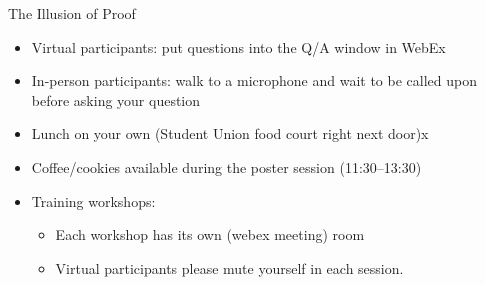 \documentclass[aspectratio=169, 12pt]{beamer}
\begin{document}
\begin{frame}{The Illusion of Proof}
  \begin{itemize}
  \item Virtual participants: put questions into the Q/A window in WebEx
  \item In-person participants: walk to a microphone and wait to be called upon
    before asking your question
  \item Lunch on your own (Student Union food court right next door)x
  \item Coffee/cookies available during the poster session (11:30--13:30)
  \item Training workshops:
    \begin{itemize}
    \item Each workshop has its own (webex meeting) room
    \item Virtual participants please mute yourself in each session.
    \end{itemize}
  \end{itemize}
\end{frame}
\end{document}
